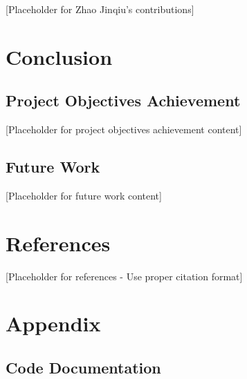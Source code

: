 \documentclass[12pt,a4paper]{article}
\begin{document}

[Placeholder for Zhao Jinqiu's contributions]

\section{Conclusion}


\subsection{Project Objectives Achievement}


[Placeholder for project objectives achievement content]

\subsection{Future Work}


[Placeholder for future work content]

\section{References}


[Placeholder for references - Use proper citation format]

\section{Appendix}


\subsection{Code Documentation}
\end{document}
